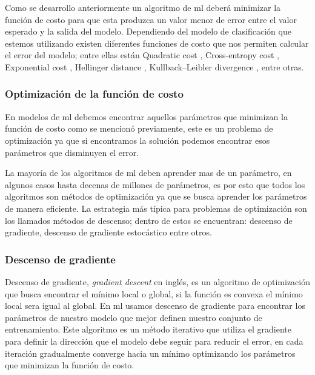 Como se desarrollo anteriormente un algoritmo de \ac{ml} deberá minimizar la función de costo para que esta produzca un valor menor de error entre el valor esperado y la salida del modelo. Dependiendo del modelo de clasificación que estemos utilizando existen diferentes funciones de costo que nos permiten calcular el error del modelo; entre ellas están Quadratic cost \citep{quadratic_cost}, Cross-entropy cost \citep{cross_entropy}, Exponential cost \citep{exponential_cost}, Hellinger distance \citep{Hellinger}, Kullback–Leibler divergence \citep{kullback}, entre otras.


\subsubsection{Optimización de la función de costo} \label{sub:gradient-desc}
En modelos de \ac{ml} debemos encontrar aquellos parámetros que minimizan la función de costo como se mencionó previamente, este es un problema de optimización ya que si encontramos la solución podemos encontrar esos parámetros que disminuyen el error.

La mayoría de los algoritmos de \ac{ml} deben aprender mas de un parámetro, en algunos casos hasta decenas de millones de parámetros, es por esto que todos los algoritmos  son métodos de optimización ya que se busca aprender los parámetros de manera eficiente. La estrategia más típica para problemas de optimización son los llamados métodos de descenso; dentro de estos se encuentran: descenso de gradiente, descenso de gradiente estocástico entre otros.

\subsubsection*{Descenso de gradiente}\label{sub:gradient-desc}
Descenso de gradiente, \textit{gradient descent} en inglés, es un algoritmo de optimización que busca encontrar el mínimo local o global, si la función es convexa el mínimo local sera igual al global. En \ac{ml} usamos descenso de gradiente para encontrar los parámetros de nuestro modelo que mejor definen nuestro conjunto de entrenamiento. Este algoritmo es un método iterativo que utiliza el gradiente para definir la dirección que el modelo debe seguir para reducir el error, en cada iteración gradualmente converge hacia un mínimo optimizando los parámetros que minimizan la función de costo. 


